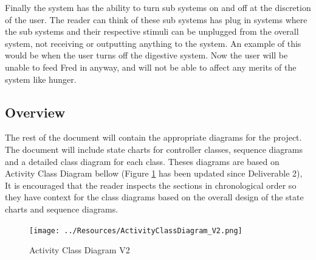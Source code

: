 \documentclass[]{article}
\begin{document}
Finally the system has the ability to turn sub systems on and off at the discretion of the user. The reader can think of these sub systems has plug in systems where the sub systems and their respective stimuli can be unplugged from the overall system, not receiving or outputting anything to the system. An example of this would be when the user turns off the digestive system. Now the user will be unable to feed Fred in anyway, and will not be able to affect any merits of the system like hunger.

\subsection*{Overview}
\label{sub:overview}
The rest of the document will contain the appropriate diagrams for the project. The document will include state charts for controller classes, sequence diagrams and a detailed class diagram for each class. Theses diagrams are based on Activity Class Diagram bellow (Figure \ref{ActivityClassDiagram} has been updated since Deliverable 2), It is encouraged that the reader inspects the sections in chronological order so they have context for the class diagrams based on the overall design of the state charts and sequence diagrams.\\

\begin{figure}[H]
	\centering
	\texttt{[image: ../Resources/ActivityClassDiagram\_V2.png]}
	\caption{Activity Class Diagram V2}
	\label{ActivityClassDiagram}
\end{figure}




\end{document}
